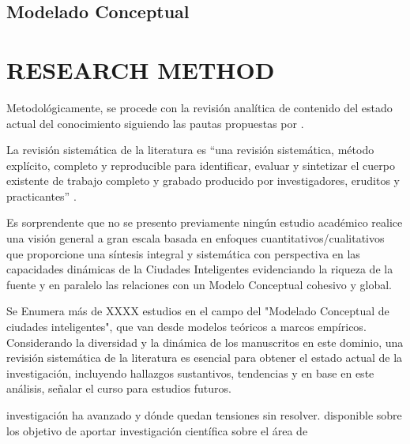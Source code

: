 \documentclass[a4paper,fleqn,spanish]{cas-dc}
\begin{document}
{{%


\subsection{Modelado Conceptual}\label{afirmacion}


\section{RESEARCH METHOD}\label{metodo}

Metodológicamente, se procede con la revisión analítica de contenido del estado
actual del conocimiento \cite{kitchenham_guidelines_2007,
webster_analyzing_2002} siguiendo las pautas propuestas por
\cite{Wolfswinkel2017}.

La revisión sistemática de la literatura es “una revisión sistemática, método
explícito, completo y reproducible para identificar, evaluar y sintetizar el
cuerpo existente de trabajo completo y grabado producido por investigadores,
eruditos y practicantes” \cite{Okoli2015}.

Es sorprendente que no se presento previamente ningún estudio académico
 realice
una visión general a gran escala basada en enfoques
 cuantitativos/cualitativos
que proporcione una síntesis integral y sistemática
 con perspectiva en las
capacidades dinámicas de la Ciudades Inteligentes
 evidenciando la riqueza de la
fuente y en paralelo las relaciones con un
 Modelo Conceptual cohesivo y
global.

Se Enumera más de XXXX estudios en el campo del "Modelado Conceptual de
ciudades
 inteligentes", que van desde modelos teóricos a marcos empíricos.
Considerando la diversidad y la dinámica de los manuscritos en este dominio,
una revisión sistemática de la literatura es esencial para obtener el estado
actual de la investigación, incluyendo hallazgos sustantivos, tendencias y en
base en este análisis,
señalar el curso para estudios futuros.

 investigación ha avanzado y dónde quedan tensiones sin resolver.
% 
 disponible sobre los
 objetivo de aportar
 investigación científica sobre el área de

}}
\end{document}

